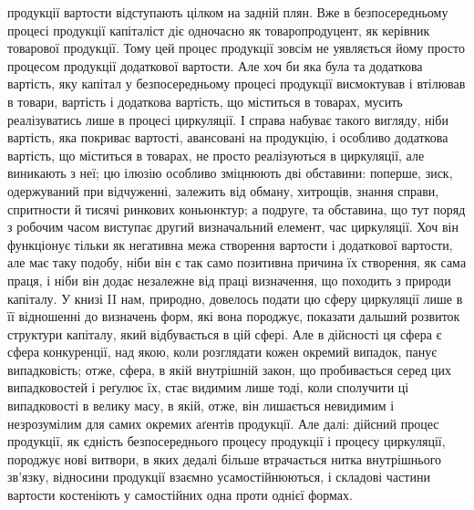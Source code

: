 \parcont{}  %
продукції вартости відступають цілком на задній плян. Вже в безпосередньому
процесі продукції капіталіст діє одночасно як товаропродуцент, як керівник
товарової продукції. Тому цей процес продукції зовсім не уявляється йому просто
процесом продукції додаткової вартости. Але хоч би яка була та додаткова
вартість, яку капітал у безпосередньому процесі продукції висмоктував і втілював
в товари, вартість і додаткова вартість, що міститься в товарах, мусить реалізуватись
лише в процесі циркуляції. І справа набуває такого вигляду, ніби вартість,
яка покриває вартості, авансовані на продукцію, і особливо додаткова
вартість, що міститься в товарах, не просто реалізуються в циркуляції, але виникають
з неї; цю ілюзію особливо зміцнюють дві обставини: поперше, зиск,
одержуваний при відчуженні, залежить від обману, хитрощів, знання справи,
спритности й тисячі ринкових коньюнктур; а подруге, та обставина, що тут
поряд з робочим часом виступає другий визначальний елемент, час циркуляції.
Хоч він функціонує тільки як негативна межа створення вартости і додаткової
вартости, але має таку подобу, ніби він є так само позитивна причина
їх створення, як сама праця, і ніби він додає незалежне від праці визначення,
що походить з природи капіталу. У книзі II нам, природно, довелось подати цю
сферу циркуляції лише в її відношенні до визначень форм, які вона породжує,
показати дальший розвиток структури капіталу, який відбувається в цій сфері.
Але в дійсності ця сфера є сфера конкуренції, над якою, коли розглядати кожен
окремий випадок, панує випадковість; отже, сфера, в якій внутрішній закон,
що пробивається серед цих випадковостей і реґулює їх, стає видимим лише тоді,
коли сполучити ці випадковості в велику масу, в якій, отже, він лишається
невидимим і незрозумілим для самих окремих аґентів продукції. Але далі: дійсний
процес продукції, як єдність безпосереднього процесу продукції і процесу
циркуляції, породжує нові витвори, в яких дедалі більше втрачається нитка
внутрішнього зв’язку, відносини продукції взаємно усамостійнюються, і складові
частини вартости костеніють у самостійних одна проти однієї формах.

